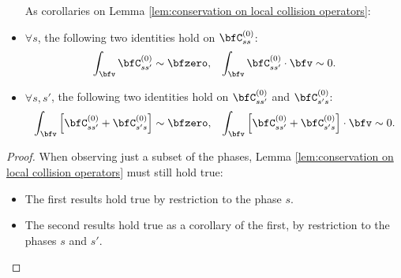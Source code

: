     \begin{corollary}
        \begin{itemize}
            As corollaries on Lemma \ref{lem:conservation on local collision operators}: 
            \item  $\forall s$, the following two identities hold on $\bfC_{ss}^{(0)}$:
            \begin{align}
                \int_{\bfv}\bfC_{ss'}^{(0)}           \sim  \bfzero,  &&
                \int_{\bfv}\bfC_{ss'}^{(0)}\cdot\bfv  \sim  0.
            \end{align}
            \item  $\forall s, s'$, the following two identities hold on $\bfC_{ss'}^{(0)}$ and $\bfC_{s's}^{(0)}$:
            \begin{align}
                \int_{\bfv}\left[\bfC_{ss'}^{(0)} + \bfC_{s's}^{(0)}\right]           \sim  \bfzero,  &&
                \int_{\bfv}\left[\bfC_{ss'}^{(0)} + \bfC_{s's}^{(0)}\right]\cdot\bfv  \sim  0.
            \end{align}
        \end{itemize}
    \end{corollary}
    \begin{proof}
        When observing just a subset of the phases, Lemma \ref{lem:conservation on local collision operators} must still hold true:
        \begin{itemize}
            \item  The first results hold true by restriction to the phase $s$.
            \item  The second results hold true as a corollary of the first, by restriction to the phases $s$ and $s'$.
        \end{itemize}
    \end{proof}
